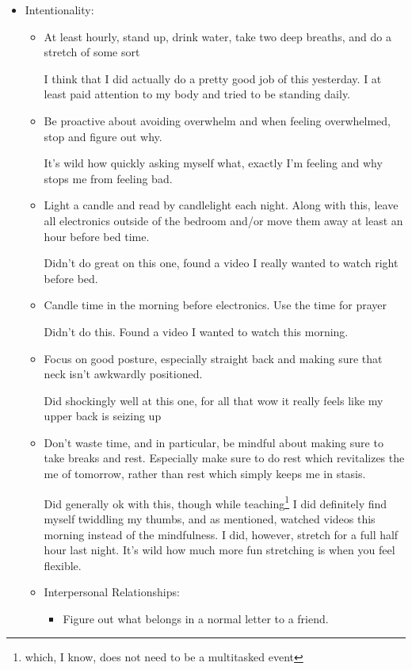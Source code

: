\documentclass[12pt]{article}[titlepage]
\newcommand{\1}{\={a}}
\newcommand{\2}{\={e}}
\newcommand{\3}{\={\i}}
\newcommand{\4}{\=o}
\newcommand{\5}{\=u}
\newcommand{\6}{\={A}}
\renewcommand{\,}{\textsuperscript{,}}
\begin{document}
\begin{itemize}   
\item Intentionality:  
\begin{itemize}  
\item At least hourly, stand up, drink water, take two deep breaths, and do a stretch of some sort

I think that I did actually do a pretty good job of this yesterday. I at least paid attention to my body and tried to be standing daily.  
\item Be proactive about avoiding overwhelm and when feeling overwhelmed, stop and figure out why.

It's wild how quickly asking myself what, exactly I'm feeling and why stops me from feeling bad.  
\item Light a candle and read by candlelight each night. Along with this, leave all electronics outside of the bedroom and/or move them away at least an hour before bed time.

Didn't do great on this one, found a video I really wanted to watch right before bed.  
\item Candle time in the morning before electronics. Use the time for prayer

Didn't do this. Found a video I wanted to watch this morning.  
\item Focus on good posture, especially straight back and making sure that neck isn't awkwardly positioned.

Did shockingly well at this one, for all that wow it really feels like my upper back is seizing up

\item Don't waste time, and in particular, be mindful about making sure to take breaks and rest. Especially make sure to do rest which revitalizes the me of tomorrow, rather than rest which simply keeps me in stasis.

Did generally ok with this, though while teaching\footnote{which, I know, does not need to be a multitasked event} I did definitely find myself twiddling my thumbs, and as mentioned, watched videos this morning instead of the mindfulness. I did, however, stretch for a full half hour last night. It's wild how much more fun stretching is when you feel flexible.

\item Interpersonal Relationships:  
\begin{itemize}   
\item Figure out what belongs in a normal letter to a friend.


\end{itemize}
\end{itemize}
\end{itemize}
\end{document}
